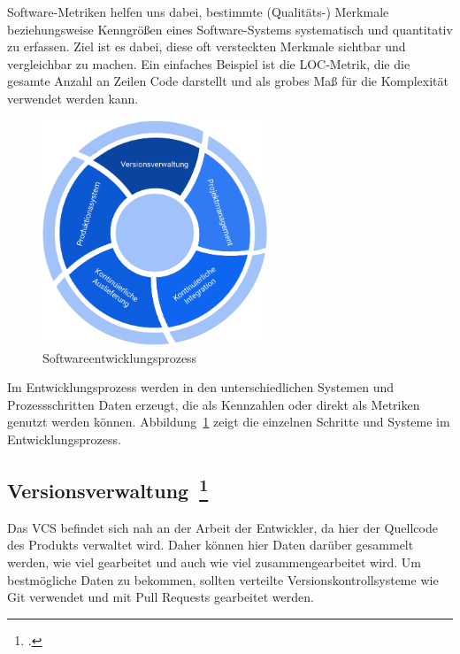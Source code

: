 Software-Metriken helfen uns dabei, bestimmte (Qualitäts-) Merkmale beziehungsweise Kenngrößen eines Software-Systems systematisch und quantitativ zu erfassen.
Ziel ist es dabei, diese oft versteckten Merkmale sichtbar und vergleichbar zu machen.
Ein einfaches Beispiel ist die \ac{LOC}-Metrik, die die gesamte Anzahl an Zeilen Code darstellt und als grobes Maß für die Komplexität verwendet werden kann.

\begin{savenotes}
  \begin{figure}[H] 
    \centering
       \includegraphics[width=0.6\textwidth]{img/software-development-lifecycle.png}
    \caption[Softwareentwicklungsprozess]{Softwareentwicklungsprozess~\label{fig:sdlc}}
  \end{figure}
\end{savenotes}

Im Entwicklungsprozess werden in den unterschiedlichen Systemen und Prozessschritten Daten erzeugt, die als Kennzahlen oder direkt als Metriken genutzt werden können.
Abbildung~\ref{fig:sdlc} zeigt die einzelnen Schritte und Systeme im Entwicklungsprozess.

\newpage
\subsection[Versionsverwaltung]{Versionsverwaltung~\footcite[vgl.][S.62ff]{davis_agile_2015}}

Das \ac{VCS} befindet sich nah an der Arbeit der Entwickler, da hier der Quellcode des Produkts verwaltet wird.
Daher können hier Daten darüber gesammelt werden, wie viel gearbeitet und auch wie viel zusammengearbeitet wird.
Um bestmögliche Daten zu bekommen, sollten verteilte Versionskontrollsysteme wie Git verwendet und mit Pull Requests gearbeitet werden.

